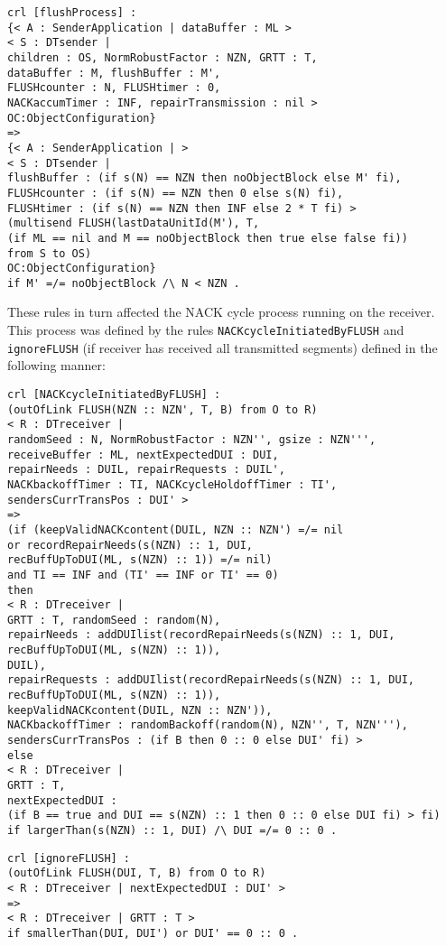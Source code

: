 \documentclass[10pt, journal]{IEEEtran}
\begin{document}
\begin{lstlisting}[caption=Rule defining ongoing NORM FLUSH Process, label=lst5:mxm,]
crl [flushProcess] :
{< A : SenderApplication | dataBuffer : ML >
< S : DTsender |
children : OS, NormRobustFactor : NZN, GRTT : T,
dataBuffer : M, flushBuffer : M', 
FLUSHcounter : N, FLUSHtimer : 0, 
NACKaccumTimer : INF, repairTransmission : nil >
OC:ObjectConfiguration}
=>
{< A : SenderApplication | >
< S : DTsender |
flushBuffer : (if s(N) == NZN then noObjectBlock else M' fi),
FLUSHcounter : (if s(N) == NZN then 0 else s(N) fi), 
FLUSHtimer : (if s(N) == NZN then INF else 2 * T fi) >
(multisend FLUSH(lastDataUnitId(M'), T, 
(if ML == nil and M == noObjectBlock then true else false fi)) 
from S to OS)
OC:ObjectConfiguration}
if M' =/= noObjectBlock /\ N < NZN .
\end{lstlisting}

These rules in turn affected the NACK cycle process running on the receiver. This process was defined by the rules \texttt{NACKcycleInitiatedByFLUSH} and \texttt{ignoreFLUSH} (if receiver has received all transmitted segments) defined in the following manner:

\begin{lstlisting}[caption=Rule defining NACK Cycle Initiation by FLUSH Message, label=lst6:mxm,]
crl [NACKcycleInitiatedByFLUSH] : 
(outOfLink FLUSH(NZN :: NZN', T, B) from O to R)
< R : DTreceiver |
randomSeed : N, NormRobustFactor : NZN'', gsize : NZN''', 
receiveBuffer : ML, nextExpectedDUI : DUI,
repairNeeds : DUIL, repairRequests : DUIL', 
NACKbackoffTimer : TI, NACKcycleHoldoffTimer : TI',
sendersCurrTransPos : DUI' >
=>
(if (keepValidNACKcontent(DUIL, NZN :: NZN') =/= nil
or recordRepairNeeds(s(NZN) :: 1, DUI, 
recBuffUpToDUI(ML, s(NZN) :: 1)) =/= nil) 
and TI == INF and (TI' == INF or TI' == 0)
then
< R : DTreceiver | 
GRTT : T, randomSeed : random(N),
repairNeeds : addDUIlist(recordRepairNeeds(s(NZN) :: 1, DUI, 
recBuffUpToDUI(ML, s(NZN) :: 1)),
DUIL),
repairRequests : addDUIlist(recordRepairNeeds(s(NZN) :: 1, DUI, 
recBuffUpToDUI(ML, s(NZN) :: 1)),
keepValidNACKcontent(DUIL, NZN :: NZN')),
NACKbackoffTimer : randomBackoff(random(N), NZN'', T, NZN'''),
sendersCurrTransPos : (if B then 0 :: 0 else DUI' fi) >
else 
< R : DTreceiver |
GRTT : T, 
nextExpectedDUI : 
(if B == true and DUI == s(NZN) :: 1 then 0 :: 0 else DUI fi) > fi)  
if largerThan(s(NZN) :: 1, DUI) /\ DUI =/= 0 :: 0 . 
\end{lstlisting}

\begin{lstlisting}[caption=Rule defining ignoring of FLUSH MESSAGE, label=lst7:mxm,]
crl [ignoreFLUSH] :
(outOfLink FLUSH(DUI, T, B) from O to R)
< R : DTreceiver | nextExpectedDUI : DUI' >
=>
< R : DTreceiver | GRTT : T >
if smallerThan(DUI, DUI') or DUI' == 0 :: 0 .
\end{lstlisting}
\end{document}
